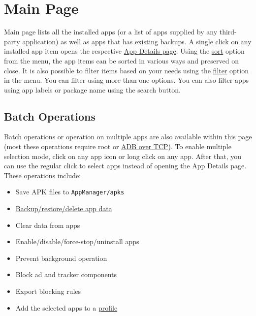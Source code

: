 \section{Main Page}\label{sec:main-page}
Main page lists all the installed apps (or a list of apps supplied by any third-party application) as well as apps that
has existing backups. A single click on any installed app item opens the respective \hyperref[sec:app-details-page]{App
Details page}. Using the \hyperlink{par:main-page-sort}{sort} option from the menu, the app items can be sorted in
various ways and preserved on close. It is also possible to filter items based on your needs using the
\hyperlink{par:main-page-filter}{filter} option in the menu. You can filter using more than one options. You can also
filter apps using app labels or package name using the search button.

\subsection{Batch Operations}\label{subsec:batch-operations}
Batch operations or operation on multiple apps are also available within this page (most these operations require root
or \hyperref[sec:adb-over-tcp]{ADB over TCP}). To enable multiple selection mode, click on any app icon or long click
on any app. After that, you can use the regular click to select apps instead of opening the App Details page. These
operations include:
\begin{itemize}
    \item Save APK files to \texttt{AppManager/apks}
    \item \hyperref[sec:backup-restore]{Backup/restore/delete app data}
    \item Clear data from apps
    \item Enable/disable/force-stop/uninstall apps
    \item Prevent background operation
    \item Block ad and tracker components
    \item Export blocking rules
    \item Add the selected apps to a \hyperref[sec:profiles-page]{profile}
\end{itemize}

